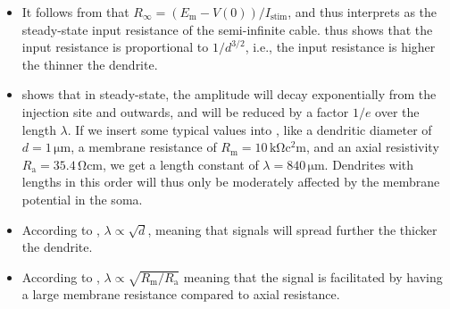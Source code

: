 \begin{itemize}

\item It follows from  that $R_{\infty} = (E_\text{m}-V(0))/I_\text{stim}$, and thus interprets as the steady-state input resistance of the semi-infinite cable.  thus shows that the input resistance is proportional to $1/d^{3/2}$, i.e., the input resistance is higher the thinner the dendrite. 

\item {} shows that in steady-state, the amplitude will decay exponentially from the injection site and outwards, and will be reduced by a factor $1/e$ over the length $\lambda$. If we insert some typical values into , like a dendritic diameter of $d=1 \, \si{\micro\metre}$, a membrane resistance of $R_\text{m}=10 \,
\si{\kilo\ohm\square\centi\metre}$, and an axial resistivity $R_\text{a}=35.4\, \si{\ohm\centi\metre}$, we get a length constant of $\lambda = 840\, \si{\micro\metre}$. Dendrites with lengths in this order will thus only be moderately affected by the membrane potential in the soma.

\item According to , $\lambda \propto \sqrt{d}$, meaning that signals will spread further the thicker the dendrite.

\item According to , $\lambda \propto \sqrt{R_\text{m}/R_\text{a}}$ meaning that the signal is facilitated by having a large membrane resistance compared to axial resistance. 
\end{itemize}


